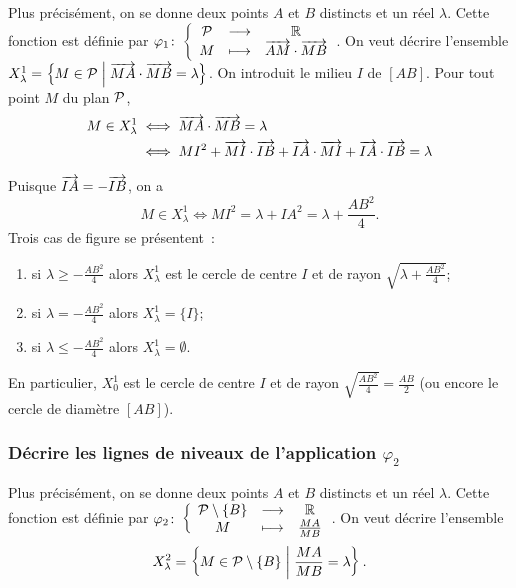 Plus précisément, on se  donne deux points \(A\) et \(B\) distincts et 
un réel \(\lambda\). Cette fonction est définie par 
\(\fonction{\varphi_1}{\P}{\R}{M}{\vect{AM} \cdot \vect{MB}}\). On veut 
décrire l'ensemble \(X_{\lambda}^{1} = \enstq{M \in \P}{\vect{MA} \cdot 
\vect{MB} = \lambda}\). On introduit le milieu \(I\) de \([AB]\). Pour 
tout point \(M\) du plan \(\P\),
\begin{align}
  M \in X_{\lambda}^{1} & \iff \vect{MA} \cdot \vect{MB} = \lambda \\ 
                        & \iff MI^2 + \vect{MI} \cdot \vect{IB} + 
                        \vect{IA} \cdot \vect{MI} + \vect{IA} \cdot 
                        \vect{IB} = \lambda
\end{align}

Puisque \(\vect{IA} = -\vect{IB}\), on a 
\begin{equation}
  M \in X_{\lambda}^{1}  \iff MI^2 = \lambda + IA^2 = \lambda + 
  \frac{AB^2}{4}.
\end{equation}
Trois cas de figure se présentent~:
\begin{enumerate}
  \item si \(\lambda \geqslant -\frac{AB^2}{4}\) alors 
    \(X_{\lambda}^{1}\) est le cercle de centre \(I\) et de rayon 
    \(\sqrt{\lambda +\frac{AB^2}{4}}\);
  \item si \(\lambda = -\frac{AB^2}{4}\) alors \(X_{\lambda}^{1} = 
    \{I\}\);
  \item si \(\lambda \leqslant -\frac{AB^2}{4}\) alors 
    \(X_{\lambda}^{1} = \emptyset\).
\end{enumerate}
En particulier, \(X_{0}^{1}\) est le cercle de centre \(I\) et de 
rayon \(\sqrt{\frac{AB^2}{4}} = \frac{AB}{2}\) (ou encore le cercle de 
diamètre \([AB]\)).

\subsubsection{Décrire les lignes de niveaux de l'application 
\(\varphi_2\)}

Plus précisément, on se donne deux points \(A\) et \(B\) distincts et 
un réel \(\lambda\). Cette fonction est définie par 
\(\fonction{\varphi_2}{\P\setminus\{B\}}{\R}{M}{\frac{MA}{MB}}\). On 
veut décrire l'ensemble
\begin{equation}
  X_{\lambda}^2 = \enstq{M \in \P\setminus\{B\}}{\frac{MA}{MB} = 
  \lambda}.
\end{equation}


